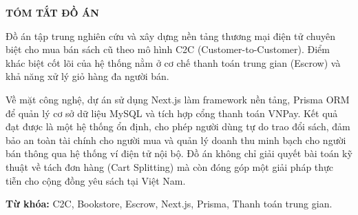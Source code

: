\documentclass[../main.tex]{subfiles}
\begin{document}
\begin{center}
    \textbf{\huge TÓM TẮT ĐỒ ÁN}
\end{center}
\vspace{0.5cm}

Đồ án tập trung nghiên cứu và xây dựng nền tảng thương mại điện tử chuyên biệt cho mua bán sách cũ theo mô hình C2C (Customer-to-Customer). Điểm khác biệt cốt lõi của hệ thống nằm ở cơ chế thanh toán trung gian (Escrow) và khả năng xử lý giỏ hàng đa người bán.

Về mặt công nghệ, dự án sử dụng Next.js làm framework nền tảng, Prisma ORM để quản lý cơ sở dữ liệu MySQL và tích hợp cổng thanh toán VNPay. Kết quả đạt được là một hệ thống ổn định, cho phép người dùng tự do trao đổi sách, đảm bảo an toàn tài chính cho người mua và quản lý doanh thu minh bạch cho người bán thông qua hệ thống ví điện tử nội bộ. Đồ án không chỉ giải quyết bài toán kỹ thuật về tách đơn hàng (Cart Splitting) mà còn đóng góp một giải pháp thực tiễn cho cộng đồng yêu sách tại Việt Nam.

\textbf{Từ khóa:} C2C, Bookstore, Escrow, Next.js, Prisma, Thanh toán trung gian.
\end{document}

